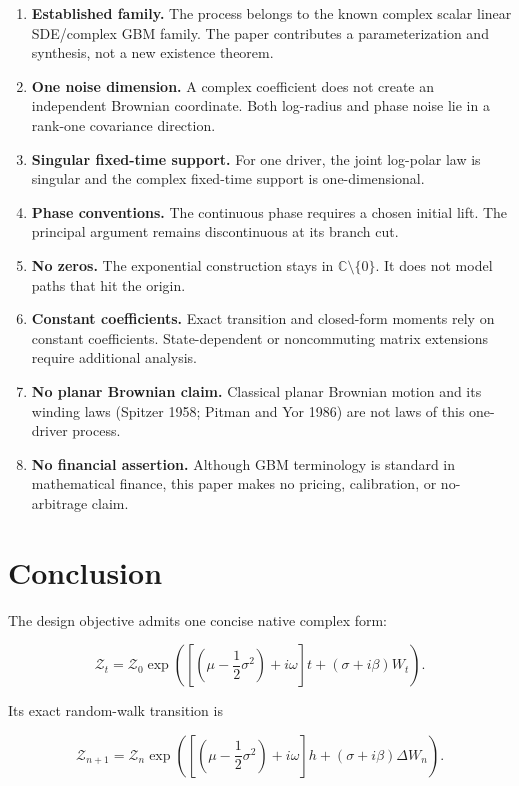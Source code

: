 \documentclass[
  english,
  10pt,
  letterpaper,
  DIV=11,
  numbers=noendperiod]{scrartcl}
\providecommand{\tightlist}{%
  \setlength{\itemsep}{0pt}\setlength{\parskip}{0pt}}
\begin{document}
\begin{enumerate}
\def\labelenumi{\arabic{enumi}.}
\tightlist
\item
  \textbf{Established family.} The process belongs to the known complex
  scalar linear SDE/complex GBM family. The paper contributes a
  parameterization and synthesis, not a new existence theorem.
\item
  \textbf{One noise dimension.} A complex coefficient does not create an
  independent Brownian coordinate. Both log-radius and phase noise lie
  in a rank-one covariance direction.
\item
  \textbf{Singular fixed-time support.} For one driver, the joint
  log-polar law is singular and the complex fixed-time support is
  one-dimensional.
\item
  \textbf{Phase conventions.} The continuous phase requires a chosen
  initial lift. The principal argument remains discontinuous at its
  branch cut.
\item
  \textbf{No zeros.} The exponential construction stays in
  \(\mathbb C\setminus\{0\}\). It does not model paths that hit the
  origin.
\item
  \textbf{Constant coefficients.} Exact transition and closed-form
  moments rely on constant coefficients. State-dependent or noncommuting
  matrix extensions require additional analysis.
\item
  \textbf{No planar Brownian claim.} Classical planar Brownian motion
  and its winding laws (Spitzer 1958; Pitman and Yor 1986) are not laws
  of this one-driver process.
\item
  \textbf{No financial assertion.} Although GBM terminology is standard
  in mathematical finance, this paper makes no pricing, calibration, or
  no-arbitrage claim.
\end{enumerate}

\section{Conclusion}\label{sec-conclusion}

The design objective admits one concise native complex form:

\[
\boxed{
\mathcal Z_t
=
\mathcal Z_0
\exp\!\left(
\left[\left(\mu-\frac12\sigma^2\right)+i\omega\right]t
+(\sigma+i\beta)W_t
\right).
}
\]

Its exact random-walk transition is

\[
\boxed{
\mathcal Z_{n+1}
=
\mathcal Z_n
\exp\!\left(
\left[\left(\mu-\frac12\sigma^2\right)+i\omega\right]h
+(\sigma+i\beta)\Delta W_n
\right).
}
\]
\end{document}
